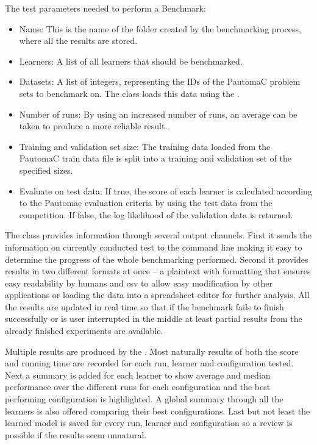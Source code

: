 The test parameters needed to perform a Benchmark:

\begin{itemize}
	\item[] Name: This is the name of the folder created by the benchmarking process, where all the results are stored.
	\item[] Learners: A list of all learners that should be benchmarked.
	\item[] Datasets: A list of integers, representing the IDs of the PautomaC problem sets to benchmark on. The  class loads this data using the .
	\item[] Number of runs: By using an increased number of runs, an average can be taken to produce a more reliable result.
	\item[] Training and validation set size: The training data loaded from the PautomaC train data file is split into a training and validation set of the specified sizes.
	\item[] Evaluate on test data: If true, the score of each learner is calculated according to the Pautomac evaluation criteria by using the test data from the competition. If false, the log likelihood of the validation data is returned.
\end{itemize}

The  class provides information through several output channels. First it sends the information on currently conducted test to the command line making it easy to determine the progress of the whole benchmarking performed. Second it provides results in two different formats at once -- a plaintext with formatting that ensures easy readability by humans and \gls{csv} to allow easy modification by other applications or loading the data into a spreadsheet editor for further analysis. All the results are updated in real time so that if the benchmark fails to finish successfully or is user interrupted in the middle at least partial results from the already finished experiments are available.

Multiple results are produced by the . Most naturally results of both the score and running time are recorded for each run, learner and configuration tested. Next a summary is added for each learner to show average and median performance over the different runs for each configuration and the best performing configuration is highlighted. A global summary through all the learners is also offered comparing their best configurations. Last but not least the learned model is saved for every run, learner and configuration so a review is possible if the results seem unnatural.

